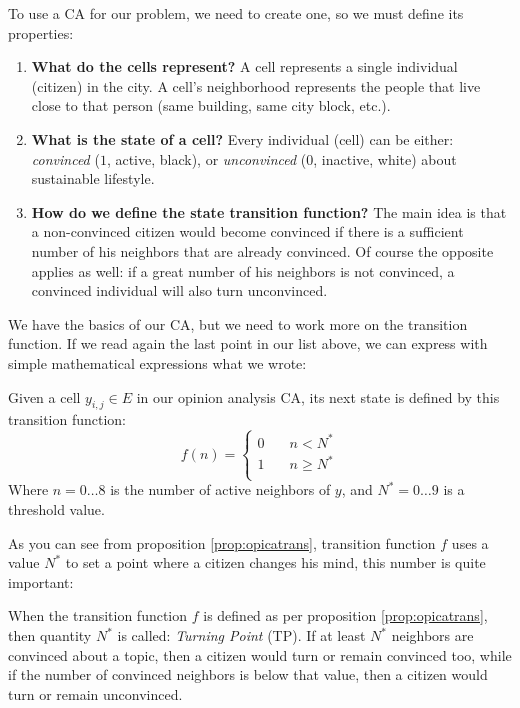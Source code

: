 To use a CA for our problem, we need to create one, so we must define its properties:

\begin{enumerate}
\item \textbf{What do the cells represent?} A cell represents a single individual (citizen) in the city.
A cell's neighborhood represents the people that live close to that person
(same building, same city block, etc.).
\item \textbf{What is the state of a cell?} Every individual (cell) can be either: \textit{convinced}
($1$, active, black), or \textit{unconvinced} ($0$, inactive, white) about sustainable lifestyle.
\item \textbf{How do we define the state transition function?} The main idea is that a non-convinced citizen
would become convinced if there is a sufficient number of his neighbors that are already convinced.
Of course the opposite applies as well: if a great number of his neighbors is not convinced,
a convinced individual will also turn unconvinced.
\end{enumerate}

We have the basics of our CA, but we need to work more on the transition function. If we read again the
last point in our list above, we can express with simple mathematical expressions what we wrote:

\begin{proposition}
\label{prop:opicatrans}
Given a cell $y_{i,j} \in E$ in our opinion analysis CA, its next state is defined by this
transition function:
\begin{equation}
f(n) =
  \begin{cases}
    0       & \quad n < N^\ast\\
    1       & \quad n \geq N^\ast\\
  \end{cases}
\end{equation}
Where $n = 0 \dots 8$ is the number of active neighbors of $y$, and $N^\ast = 0 \dots 9$ is a threshold
value.
\end{proposition}

As you can see from proposition \ref{prop:opicatrans}, transition function $f$ uses a value $N^\ast$ to
set a point where a citizen changes his mind, this number is quite important:

\begin{definition}
\label{def:tp}
When the transition function $f$ is defined as per proposition \ref{prop:opicatrans}, then quantity
$N^\ast$ is called: \textit{Turning Point} (TP).
If at least $N^\ast$ neighbors are convinced about
a topic, then a citizen would turn or remain convinced too, while if the number of convinced neighbors
is below that value, then a citizen would turn or remain unconvinced.
\end{definition}

